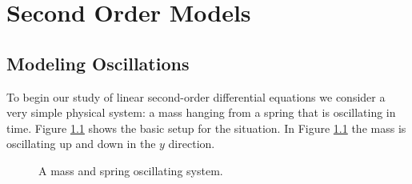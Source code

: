 \chapter{Second Order Models}

\section{Modeling Oscillations}
To begin our study of linear second-order differential equations we consider a very simple
physical system: a mass hanging from a spring that is oscillating in time. Figure
\ref{fig:7.8.mass_spring} shows the basic setup for the situation. In Figure
\ref{fig:7.8.mass_spring} the mass is oscillating up and down in the $y$ direction.

\begin{figure}[ht!]
    \begin{center}
    \end{center}
    \caption{A mass and spring oscillating system.}
    \label{fig:7.8.mass_spring}
\end{figure}


